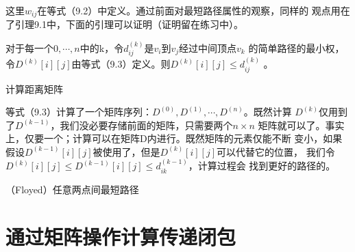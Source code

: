 这里$w_{ij}$在等式（9.2）中定义。通过前面对最短路径属性的观察，同样的
观点用在了引理9.1中，下面的引理可以证明（证明留在练习中）。

\begin{lemma}
对于每一个$0,\cdots,n$中的k，令$d_{ij}^{(k)}$是$v_i$到$v_j$经过中间顶点$v_k$
的简单路径的最小权，令$D^{(k)}[i][j]$由等式（9.3）定义。则$D^{(k)}[i][j]\leq d_{ij}^{(k)}$ 。
\end{lemma}

\begin{example}
 计算距离矩阵
\end{example}

等式（9.3）计算了一个矩阵序列：$D^{(0)},D^{(1)},\cdots, D^{(n)}$。既然计算
$D^{(k)}$仅用到了$D^{(k-1)}$，我们没必要存储前面的矩阵，只需要两个$n\times n$
矩阵就可以了。事实上，仅要一个；计算可以在矩阵D内进行。既然矩阵的元素仅能不断
变小，如果假设$D^{(k-1)}[i][j]$被使用了，但是$D^{(k)}[i][j]$可以代替它的位置，
我们令$D^{(k)}[i][j] \leq D^{(k-1)}[i][j] \leq d_{ik}^{(k-1)}$，计算过程会
找到更好的路径的。

\begin{algorithm}
（Floyed）任意两点间最短路径
\end{algorithm}

\section{通过矩阵操作计算传递闭包}
